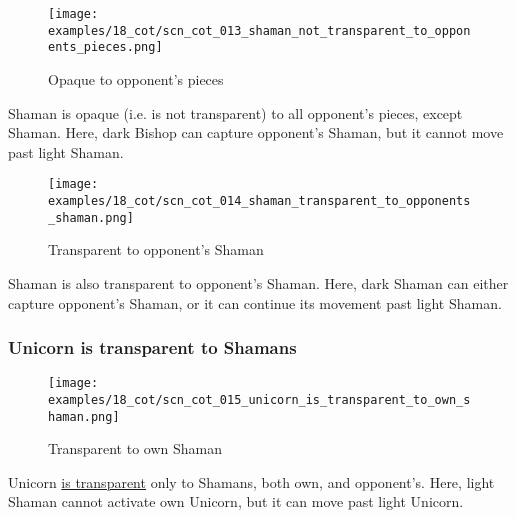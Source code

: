 \vspace*{2.7\baselineskip}
\noindent
\begin{wrapfigure}[6]{l}{0.4\textwidth}
\centering
\texttt{[image: examples/18\_cot/scn\_cot\_013\_shaman\_not\_transparent\_to\_opponents\_pieces.png]}
\vspace*{-1.4\baselineskip}
\caption{Opaque to opponent's pieces}
\label{fig:scn_cot_013_shaman_not_transparent_to_opponents_pieces}
\end{wrapfigure}
Shaman is opaque (i.e. is not transparent) to all opponent's pieces, except Shaman. \newline
\indent
Here, dark Bishop can capture opponent's Shaman, but it cannot move past light Shaman.

\vspace*{2.7\baselineskip}
\noindent
\begin{wrapfigure}[6]{l}{0.4\textwidth}
\centering
\texttt{[image: examples/18\_cot/scn\_cot\_014\_shaman\_transparent\_to\_opponents\_shaman.png]}
\vspace*{-1.4\baselineskip}
\caption{Transparent to opponent's Shaman}
\label{fig:scn_cot_014_shaman_transparent_to_opponents_shaman}
\end{wrapfigure}
Shaman is also transparent to opponent's Shaman. \newline
\indent
Here, dark Shaman can either capture opponent's Shaman, or it can continue its movement
past light Shaman.

\clearpage %

\subsubsection*{Unicorn is transparent to Shamans}
\label{sec:Conquest of Tlalocan/Shaman/Movement/Unicorn is transparent to Shamans}

\vspace*{-0.7\baselineskip}
\noindent
\begin{wrapfigure}[6]{l}{0.4\textwidth}
\centering
\texttt{[image: examples/18\_cot/scn\_cot\_015\_unicorn\_is\_transparent\_to\_own\_shaman.png]}
\vspace*{-1.4\baselineskip}
\caption{Transparent to own Shaman}
\label{fig:scn_cot_015_unicorn_is_transparent_to_own_shaman}
\end{wrapfigure}
Unicorn \hyperref[fig:scn_mv_07_wave_is_transparent]{is transparent} only to Shamans,
both own, and opponent's. \newline
\indent
Here, light Shaman cannot activate own Unicorn, but it can move past light Unicorn.

